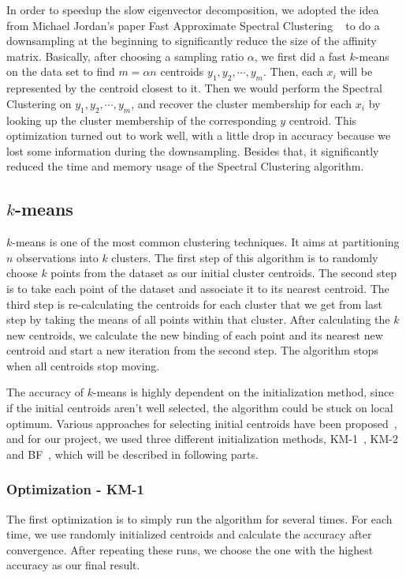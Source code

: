 \documentclass{acm_proc_article-sp}
\begin{document}
In order to speedup the slow eigenvector decomposition, we adopted the idea from Michael Jordan's paper Fast Approximate Spectral Clustering ~\cite{yan2009fast} to do a downsampling at the beginning to significantly reduce the size of the affinity matrix. Basically, after choosing a sampling ratio $\alpha$, we first did a fast $k$-means on the data set to find $m = \alpha n$ centroids $y_1, y_2, \cdots, y_m$. Then, each $x_i$ will be represented by the centroid closest to it. Then we would perform the Spectral Clustering on $y_1, y_2, \cdots, y_m$, and recover the cluster membership for each $x_i$ by looking up the cluster membership of the corresponding $y$ centroid. This optimization turned out to work well, with a little drop in accuracy because we lost some information during the downsampling. Besides that, it significantly reduced the time and memory usage of the Spectral Clustering algorithm.

\subsection{$k$-means}
$k$-means is one of the most common clustering techniques. It aims at partitioning $n$ observations into $k$ clusters. The first step of this algorithm is to randomly choose $k$ points from the dataset as our initial cluster centroids. The second step is to take each point of the dataset and associate it to its nearest centroid. The third step is re-calculating the centroids for each cluster that we get from last step by taking the means of all points within that cluster. After calculating the $k$ new centroids, we calculate the new binding of each point and its nearest new centroid and start a new iteration from the second step. The algorithm stops when all centroids stop moving.

The accuracy of $k$-means is highly dependent on the initialization method, since if the initial centroids aren't well selected, the algorithm could be stuck on local optimum. Various approaches for selecting initial centroids have been proposed~\cite{kanungo2002efficient, arthur2007k, khan2004cluster}, and for our project, we used three different initialization methods, KM-1~\cite{hartigan1979algorithm}, KM-2~\cite{yan2009fast} and BF~\cite{bradley1998refining}, which will be described in following parts.

\subsubsection{Optimization - KM-1}
The first optimization is to simply run the algorithm for several times. For each time, we use randomly initialized centroids and calculate the accuracy after convergence. After repeating these runs, we choose the one with the highest accuracy as our final result.
\end{document}
